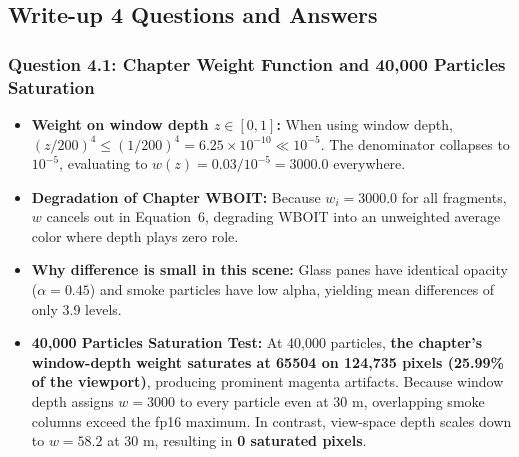 \documentclass[10pt,a4paper]{article}
\begin{document}
\subsection{Write-up 4 Questions and Answers}

\subsubsection*{Question 4.1: Chapter Weight Function and 40,000 Particles Saturation}
\begin{itemize}
    \item \textbf{Weight on window depth $z \in [0, 1]$:} When using window depth, $(z/200)^4 \le (1/200)^4 = 6.25 \times 10^{-10} \ll 10^{-5}$. The denominator collapses to $10^{-5}$, evaluating to $w(z) = 0.03 / 10^{-5} = \mathbf{3000.0}$ everywhere.
    \item \textbf{Degradation of Chapter WBOIT:} Because $w_i = 3000.0$ for all fragments, $w$ cancels out in Equation~6, degrading WBOIT into an unweighted average color where depth plays zero role.
    \item \textbf{Why difference is small in this scene:} Glass panes have identical opacity ($\alpha = 0.45$) and smoke particles have low alpha, yielding mean differences of only 3.9 levels.
    \item \textbf{40,000 Particles Saturation Test:} At 40,000 particles, \textbf{the chapter's window-depth weight saturates at 65504 on 124,735 pixels (25.99\% of the viewport)}, producing prominent magenta artifacts. Because window depth assigns $w = 3000$ to every particle even at 30 m, overlapping smoke columns exceed the fp16 maximum. In contrast, view-space depth scales down to $w = 58.2$ at 30 m, resulting in \textbf{0 saturated pixels}.
\end{itemize}
\end{document}
